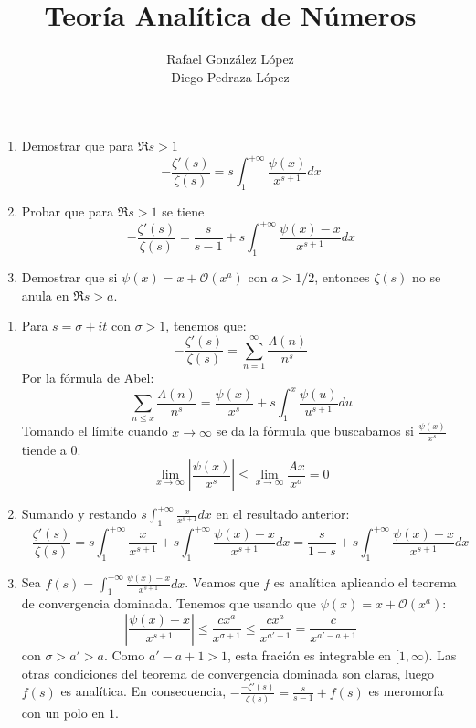 \documentclass[twoside]{article}
\begin{document}
\title{Teoría Analítica de Números}
\author{Rafael González López\\Diego Pedraza López}
\maketitle

\begin{ejercicio}{1}
\begin{enumerate}
	\item Demostrar que para $\Re s > 1$
	\[ -\frac{ζ'(s)}{ζ(s)} = s \int_1^{+∞} \frac{ψ(x)}{x^{s+1}} dx \]
	\item Probar que para $\Re s > 1$ se tiene
	\[ -\frac{ζ'(s)}{ζ(s)} = \frac{s}{s-1} + s \int_1^{+∞} \frac{ψ(x)-x}{x^{s+1}}dx \]
	\item Demostrar que si $ψ(x) = x + \mathcal{O}(x^a)$ con $a > 1/2$, entonces $ζ(s)$ no se anula en $\Re s > a$.
\end{enumerate}
\end{ejercicio}
\begin{solucion}
\begin{enumerate}
	\item Para $s=σ+it$ con $σ>1$, tenemos que:
\[ - \frac{ζ'(s)}{ζ(s)} = \sum_{n=1}^{∞} \frac{Λ(n)}{n^s} \]
Por la fórmula de Abel:
\[ \sum_{n≤x} \frac{Λ(n)}{n^s} = \frac{ψ(x)}{x^s} + s \int_1^{x} \frac{ψ(u)}{u^{s+1}} du \]
Tomando el límite cuando $x\to∞$ se da la fórmula que buscabamos si $\frac{ψ(x)}{x^s}$ tiende a $0$.
\[ \lim_{x \to ∞} \left|\frac{ψ(x)}{x^s}\right| ≤ \lim_{x \to ∞} \frac{Ax}{x^σ} = 0\]
	\item Sumando y restando $s\int_1^{+∞} \frac{x}{x^{s+1}}dx$ en el resultado anterior:
	\[ -\frac{ζ'(s)}{ζ(s)} = s\int_1^{+∞} \frac{x}{x^{s+1}} + s \int_1^{+∞} \frac{ψ(x)-x}{x^{s+1}} dx = \frac{s}{1-s} + s \int_1^{+∞} \frac{ψ(x)-x}{x^{s+1}} dx \]
	\item Sea $f(s) = \int_1^{+∞} \frac{ψ(x)-x}{x^{s+1}} dx$. Veamos que $f$ es analítica aplicando el teorema de convergencia dominada. Tenemos que usando que $ψ(x) = x+\mathcal{O}(x^a)$:
	\[ \left|\frac{ψ(x)-x}{x^{s+1}}\right| ≤ \frac{cx^a}{x^{σ+1}} ≤ \frac{cx^a}{x^{a'+1}} = \frac{c}{x^{a'-a+1}} \]
	con $σ > a' > a$. Como $a'-a+1 > 1$, esta fración es integrable en $[1,∞)$. Las otras condiciones del teorema de convergencia dominada son claras, luego $f(s)$ es analítica. En consecuencia, $-\frac{-ζ'(s)}{ζ(s)} = \frac{s}{s-1}+f(s)$ es meromorfa con un polo en $1$.
\end{enumerate}
\end{solucion}
\end{document}
